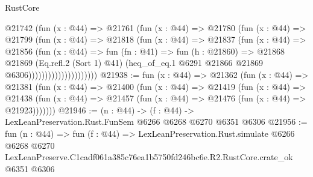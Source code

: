 \begin{lexlean}{RustCore}
\begin{coremodule}
                            @21742
                              (fun (x : @44) =>
                              @21761
                                (fun (x : @44) =>
                                @21780
                                  (fun (x : @44) =>
                                  @21799
                                    (fun (x : @44) =>
                                    @21818
                                      (fun (x : @44) =>
                                      @21837
                                        (fun (x : @44) =>
                                        @21856
                                          (fun (x : @44) =>
                                          fun (fn : @41) =>
                                          fun (h : @21860) =>
                                          @21868
                                            @21869
                                            (Eq.refl.{2} (Sort 1) @41)
                                            (heq_of_eq.{1}
                                              @6291
                                              @21866
                                              @21869
                                              @6306)))))))))))))))))))))
@21938 := fun (x : @44) =>
  @21362
    (fun (x : @44) =>
    @21381
      (fun (x : @44) =>
      @21400
        (fun (x : @44) =>
        @21419
          (fun (x : @44) =>
          @21438 (fun (x : @44) => @21457 (fun (x : @44) => @21476 (fun (x : @44) => @21923)))))))
@21946 := (n : @44) -> (f : @44) -> LexLeanPreservation.Rust.FunSem @6266 @6268 @6270 @6351 @6306
@21956 := fun (n : @44) =>
  fun (f : @44) =>
  LexLeanPreservation.Rust.simulate
    @6266
    @6268
    @6270
    LexLeanPreserve.C1cadf061a385c76ea1b5750fd246bc6e.R2.RustCore.crate_ok
    @6351
    @6306
\end{coremodule}
\end{lexlean}

